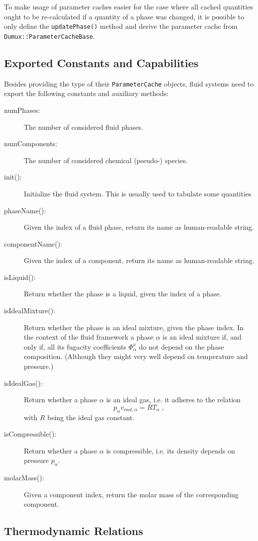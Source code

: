 To make usage of parameter caches easier for the case where all cached
quantities ought to be re-calculated if a quantity of a phase was
changed, it is possible to only define the \texttt{updatePhase()}
method and derive the parameter cache from
\texttt{Dumux::ParameterCacheBase}.

\subsection{Exported Constants and Capabilities}

Besides providing the type of their \texttt{ParameterCache} objects,
fluid systems need to export the following constants and auxiliary
methods:
\begin{description}
\item[numPhases:] The number of considered fluid phases.
\item[numComponents:] The number of considered chemical (pseudo-)
  species.
\item[init():] Initialize the fluid system. This is usually used to
  tabulate some quantities
\item[phaseName():] Given the index of a fluid phase, return its name
  as human-readable string.
\item[componentName():] Given the index of a component, return its
  name as human-readable string.
\item[isLiquid():] Return whether the phase is a liquid, given the
  index of a phase.
\item[isIdealMixture():] Return whether the phase is an ideal mixture,
  given the phase index. In the context of the \eWoms fluid
  framework a phase $\alpha$ is an ideal mixture if, and only if, all
  its fugacity coefficients $\Phi^\kappa_\alpha$ do not depend on the
  phase composition. (Although they might very well depend on
  temperature and pressure.)
\item[isIdealGas():] Return whether a phase $\alpha$ is an ideal gas,
  i.e. it adheres to the relation
  \[
  p_\alpha v_{mol,\alpha} = R T_\alpha \;,
  \]
  with $R$ being the ideal gas constant.
\item[isCompressible():] Return whether a phase $\alpha$ is
  compressible, i.e. its density depends on pressure $p_\alpha$.
\item[molarMass():] Given a component index, return the molar mass of
  the corresponding component.
\end{description}

\subsection{Thermodynamic Relations}

